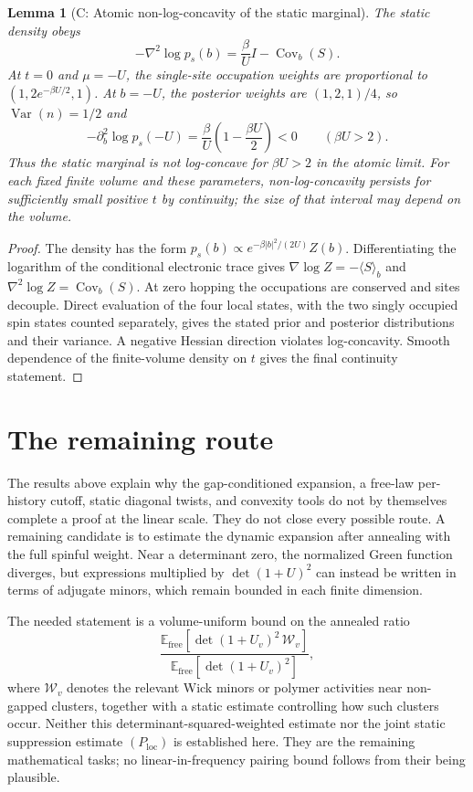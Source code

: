 \documentclass[11pt]{article}
\newtheorem{lemma}[theorem]{Lemma}
\theoremstyle{definition}
\theoremstyle{remark}
\newcommand{\E}{\mathbb{E}}
\newcommand{\free}{\mathrm{free}}
\begin{document}
\begin{lemma}[C: Atomic non-log-concavity of the static marginal]\label{lem:C}
The static density obeys
\[
 -\nabla^2\log p_s(b)=\frac{\beta}{U}I-\operatorname{Cov}_b(S).
\]
At $t=0$ and $\mu=-U$, the single-site occupation weights are proportional to $(1,2e^{-\beta U/2},1)$. At $b=-U$, the posterior weights are $(1,2,1)/4$, so $\operatorname{Var}(n)=1/2$ and
\[
 -\partial_b^2\log p_s(-U)=\frac{\beta}{U}\left(1-\frac{\beta U}{2}\right)<0\qquad(\beta U>2).
\]
Thus the static marginal is not log-concave for $\beta U>2$ in the atomic limit. For each fixed finite volume and these parameters, non-log-concavity persists for sufficiently small positive $t$ by continuity; the size of that interval may depend on the volume.
\end{lemma}

\begin{proof}
The density has the form $p_s(b)\propto e^{-\beta|b|^2/(2U)}Z(b)$. Differentiating the logarithm of the conditional electronic trace gives $\nabla\log Z=-\langle S\rangle_b$ and $\nabla^2\log Z=\operatorname{Cov}_b(S)$. At zero hopping the occupations are conserved and sites decouple. Direct evaluation of the four local states, with the two singly occupied spin states counted separately, gives the stated prior and posterior distributions and their variance. A negative Hessian direction violates log-concavity. Smooth dependence of the finite-volume density on $t$ gives the final continuity statement.
\end{proof}

\section{The remaining route}

The results above explain why the gap-conditioned expansion, a free-law per-history cutoff, static diagonal twists, and convexity tools do not by themselves complete a proof at the linear scale. They do not close every possible route. A remaining candidate is to estimate the dynamic expansion after annealing with the full spinful weight. Near a determinant zero, the normalized Green function diverges, but expressions multiplied by $\det(1+U)^2$ can instead be written in terms of adjugate minors, which remain bounded in each finite dimension.

The needed statement is a volume-uniform bound on the annealed ratio
\[
 \frac{\E_{\free}\!\left[\det(1+U_v)^2\,\mathcal W_v\right]}
 {\E_{\free}\!\left[\det(1+U_v)^2\right]},
\]
where $\mathcal W_v$ denotes the relevant Wick minors or polymer activities near non-gapped clusters, together with a static estimate controlling how such clusters occur. Neither this determinant-squared-weighted estimate nor the joint static suppression estimate $(P_{\mathrm{loc}})$ is established here. They are the remaining mathematical tasks; no linear-in-frequency pairing bound follows from their being plausible.
\end{document}
